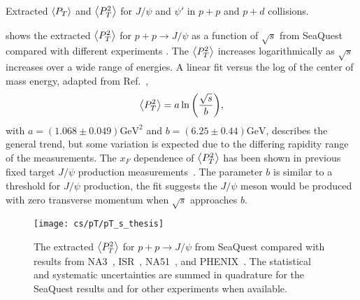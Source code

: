\documentclass[../main.tex]{subfiles}
\begin{document}
\begin{table}[h!]
	\centering
	\caption{Extracted $\expval{P_T}$ and $\expval{P^2_T}$ for $J/\psi$ and $\psi'$ in $p+p$ and $p+d$ collisions.}
	\label{tab:kaplan_result}
	
\end{table}

 shows the extracted $\expval{P_T^2}$ for $p+p\to J/\psi$ as a function
of $\sqrt{s}$ from SeaQuest compared with different experiments
\cite{badier1983,clark1978,drapier1998,acharya2020}. The $\expval{P_T^2}$
increases logarithmically as $\sqrt{s}$ increases over a wide range of energies.
A linear fit versus the log of the center of mass energy, adapted from Ref.~\cite{acharya2020},
\begin{equation}
	\expval{P_T^2}=a\ln{\left( \frac{\sqrt{s}}{b} \right)},
\end{equation}
with $a=\left(1.068\pm0.049\right)\unit{\GeV\squared}$ and $b=\left(6.25\pm0.44\right)\unit{\GeV}$,
describes the general trend, but some variation is expected due to the differing
rapidity range of the measurements. The $x_F$ dependence of $\expval{P_T^2}$ has been shown in
previous fixed target $J/\psi$ production measurements~\cite{biino1987}.
The parameter $b$ is similar to a threshold for $J/\psi$ production, 
the fit suggests the $J/\psi$ meson would be produced with zero transverse momentum when $\sqrt{s}$ approaches $b$.

\begin{figure}
	\centering
	\texttt{[image: cs/pT/pT\_s\_thesis]}
	\caption{The extracted $\expval{P_T^2}$ for $p+p\rightarrow J/\psi$ from SeaQuest compared
		with results from NA3~\cite{badier1983}, ISR~\cite{clark1978}, NA51~\cite{drapier1998},
		and PHENIX~\cite{acharya2020}. The statistical and systematic uncertainties are summed in quadrature for
		the SeaQuest results and for other experiments when available.   }
	\label{fig:pT_s}
\end{figure}

\FloatBarrier

\ifSubfilesClassLoaded{ \printbibliography[heading=bibintoc,title={References}]}{}
\end{document}
